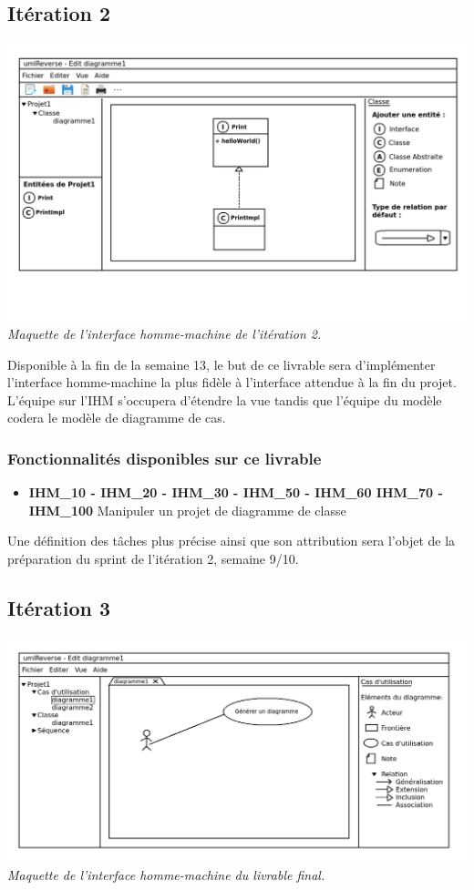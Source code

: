 \documentclass[hidelinks, 10pt,a4paper]{article}
\begin{document}
\subsection{Itération 2}
\begin{center}
  \includegraphics[width=\textwidth]{imgPDD/ihm_it2.png}
\textit{Maquette de l'interface homme-machine de l'itération 2.}
\end{center}

Disponible à la fin de la semaine 13, le but de ce livrable
sera d'implémenter l'interface homme-machine la plus fidèle à l'interface attendue à
la fin du projet. L'équipe sur l'IHM s'occupera d'étendre la vue tandis que l'équipe du 
modèle codera le modèle de diagramme de cas. 

\subsubsection{Fonctionnalités disponibles sur ce livrable}
\begin{itemize}
  \item \textbf{IHM\_10 - IHM\_20 - IHM\_30 - IHM\_50 - IHM\_60 IHM\_70 - IHM\_100} Manipuler un projet de diagramme de classe
\end{itemize}

Une définition des tâches plus précise ainsi que son attribution sera l'objet de la
préparation du sprint de l'itération 2, semaine 9/10.

\subsection{Itération 3}
\begin{center}
  \includegraphics[width=\textwidth]{imgPDD/ihm_it3.png}
\textit{Maquette de l'interface homme-machine du livrable final.}
\end{center}
\end{document}
